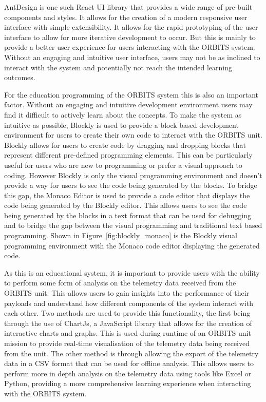 \documentclass[a4paper,12pt,titlepage]{report}
\begin{document}
AntDesign is one such React UI library that provides a wide range of pre-built components and styles. It allows for the creation of a modern responsive user interface with simple extensibility. It allows for the rapid prototyping of the user interface to allow for more iterative development to occur. But this is mainly to provide a better user experience for users interacting with the ORBITS system. Without an engaging and intuitive user interface, users may not be as inclined to interact with the system and potentially not reach the intended learning outcomes. 

For the education programming of the ORBITS system this is also an important factor. Without an engaging and intuitive development environment users may find it difficult to actively learn about the concepts. To make the system as intuitive as possible, Blockly \cite{Blockly} is used to provide a block based development environment for users to create their own code to interact with the ORBITS unit. Blockly allows for users to create code by dragging and dropping blocks that represent different pre-defined programming elements. This can be particularly useful for users who are new to programming or prefer a visual approach to coding. However Blockly is only the visual programming environment and doesn't provide a way for users to see the code being generated by the blocks. To bridge this gap, the Monaco Editor is used to provide a code editor that displays the code being generated by the Blockly editor. This allows users to see the code being generated by the blocks in a text format that can be used for debugging and to bridge the gap between the visual programming and traditional text based programming. Shown in Figure~\ref{fig:blockly_monaco} is the Blockly visual programming environment with the Monaco code editor displaying the generated code.

As this is an educational system, it is important to provide users with the ability to perform some form of analysis on the telemetry data received from the ORBITS unit. This allows users to gain insights into the performance of their payloads and understand how different components of the system interact with each other. Two methods are used to provide this functionality, the first being through the use of ChartJs, a JavaScript library that allows for the creation of interactive charts and graphs. This is used during runtime of an ORBITS unit mission to provide real-time visualisation of the telemetry data being received from the unit. The other method is through allowing the export of the telemetry data in a CSV format that can be used for offline analysis. This allows users to perform more in depth analysis on the telemetry data using tools like Excel or Python, providing a more comprehensive learning experience when interacting with the ORBITS system.
\end{document}
